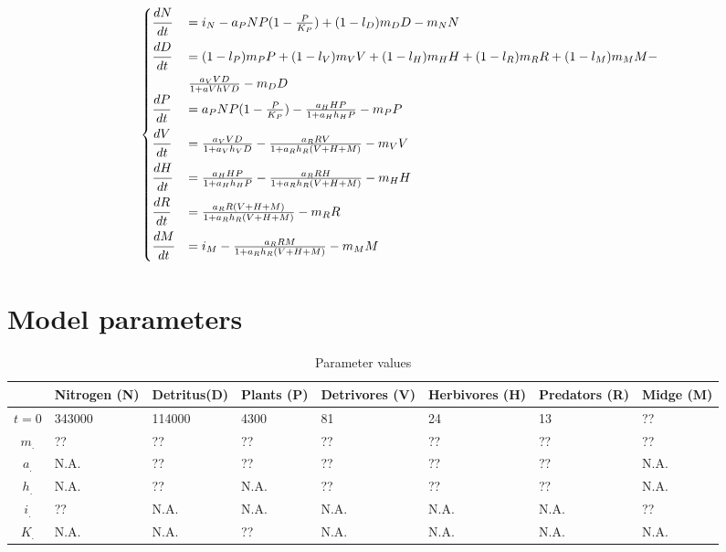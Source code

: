 \documentclass[12pt]{article}
\newcommand{\ra}[1]{\renewcommand{\arraystretch}{#1}}
\begin{document}
\begin{eqnarray*}
	\begin{cases}
		\displaystyle{\frac{\strut dN}{ \strut dt}}&= i_N  - a_P N P(1- \frac{P}{K_P}) + (1 - l_D) m_D D - m_N N \\ 
		\displaystyle{\frac{\strut dD}{\strut dt}} &= (1 - l_P) m_P P  + (1 - l_V) m_V V + (1 - l_H) m_H H + (1 - l_R) m_R R + (1 - l_M) m_M M -\\ 
			&\frac{a_V V D}{1 + aV hV D} - m_D D \\ 
		\displaystyle{\frac{\strut dP}{\strut dt}} &= a_P N P(1- \frac{P}{K_P}) - \frac{a_H H P}{1 + a_H h_H P} - m_P P \\
		\displaystyle{\frac{\strut dV}{\strut dt}} &= \frac{a_V V D}{1 + a_V h_V D} - \frac{a_R R V}{1 + a_R h_R (V + H + M)} - m_V V \\
		\displaystyle{\frac{\strut dH}{\strut dt}} &= \frac{a_H H P}{1 + a_H h_H P} - \frac{a_R R H}{1 + a_R h_R (V + H + M)} - m_H H \\
		\displaystyle{\frac{\strut dR}{\strut dt}} &= \frac{a_R R (V + H + M)}{1 + a_R h_R (V + H + M)} - m_R R \\
		\displaystyle{\frac{\strut dM}{\strut dt}} &=  i_M - \frac{a_R R M}{1 + a_R h_R (V + H + M)} - m_M M
	\end{cases}
\end{eqnarray*}

\section{Model parameters} %
\label{sec:model_parameters}
\begin{sidewaystable}
	\centering \ra{1.3}
	\caption{Parameter values}
	\begin{tabular}{@{}clllllll@{}}\toprule
	  & Nitrogen (N) & Detritus(D) &  Plants (P) & Detrivores (V) & Herbivores (H) & Predators (R) & Midge (M)\\ 
	  \midrule
	  $t = 0$ &  343000 & 114000 & 4300 & 81 & 24 & 13 & ??\\
	  $ m_.$ & ?? & ?? & ?? & ?? & ?? & ?? & ??\\
	  $a_.$ & N.A. & ?? & ?? & ?? & ?? & ?? & N.A. \\
	  $h_.$ & N.A. & ?? & N.A. & ?? & ?? & ?? & N.A.\\
	  $i_.$ & ?? & N.A. & N.A. & N.A. & N.A. & N.A. & ??\\
	  $K_.$ & N.A. & N.A. & ?? & N.A. & N.A. & N.A. & N.A.\\
	  \bottomrule
	\end{tabular}
\end{sidewaystable}

\end{document}
